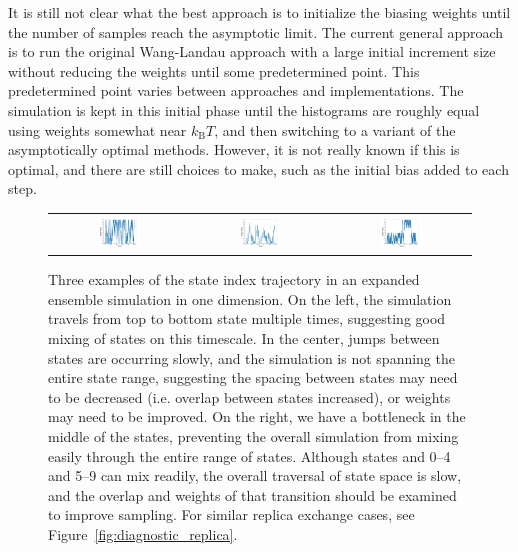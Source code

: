 \documentclass[9pt,review]{livecoms}
\begin{document}
It is still not clear what the best approach is to initialize the biasing weights until the number of samples reach the asymptotic limit.  The current general approach is to run the original Wang-Landau approach with a large initial increment size without reducing the weights until some predetermined point. This predetermined point varies between approaches and implementations.  The simulation is kept in this initial phase until the histograms are roughly equal using weights somewhat near $k_\mathrm{B}T$, and then switching to a variant of the asymptotically optimal methods. However, it is not really known if this is optimal, and there are still choices to make, such as the initial bias added to each step.


\begin{figure}[!ht]
    \centering
\begin{tabular}{c|c|c}
\includegraphics[width=0.33\textwidth]{Figures/diagnostic_figures/goodmixing_exp.png} & \includegraphics[width=0.33\textwidth]{Figures/diagnostic_figures/slowmixing_exp.png}&
\includegraphics[width=0.33\textwidth]{Figures/diagnostic_figures/sepmixing_exp.png}
\end{tabular}
    \caption{Three examples of the state index trajectory in an expanded ensemble simulation in one dimension. On the left, the simulation travels from top to bottom state multiple times, suggesting good mixing of states on this timescale.  In the center, jumps between states are occurring slowly, and the simulation is not spanning the entire state range, suggesting the spacing between states may need to be decreased (i.e. overlap between states increased), or weights may need to be improved. On the right, we have a bottleneck in the middle of the states, preventing the overall simulation from mixing easily through the entire range of states. Although states and 0--4 and 5--9 can mix readily, the overall traversal of state space is slow, and the overlap and weights of that transition should be examined to improve sampling. For similar  replica exchange cases, see Figure~\ref{fig:diagnostic_replica}.}
    \label{fig:diagnostic_expanded}
\end{figure}
\end{document}
